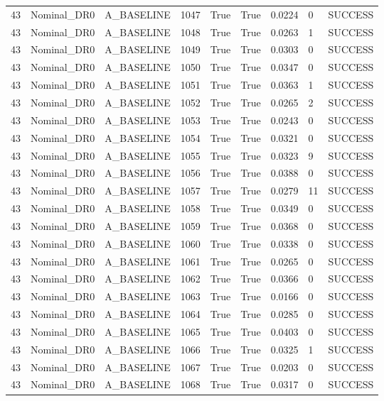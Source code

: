 \documentclass[11pt,a4paper,oneside]{book}
\begin{document}
\begin{longtable}{l l l l l l l l l}
43 & Nominal\_DR0 & A\_BASELINE & 1047 & True & True & 0.0224 & 0 & SUCCESS \\
43 & Nominal\_DR0 & A\_BASELINE & 1048 & True & True & 0.0263 & 1 & SUCCESS \\
43 & Nominal\_DR0 & A\_BASELINE & 1049 & True & True & 0.0303 & 0 & SUCCESS \\
43 & Nominal\_DR0 & A\_BASELINE & 1050 & True & True & 0.0347 & 0 & SUCCESS \\
43 & Nominal\_DR0 & A\_BASELINE & 1051 & True & True & 0.0363 & 1 & SUCCESS \\
43 & Nominal\_DR0 & A\_BASELINE & 1052 & True & True & 0.0265 & 2 & SUCCESS \\
43 & Nominal\_DR0 & A\_BASELINE & 1053 & True & True & 0.0243 & 0 & SUCCESS \\
43 & Nominal\_DR0 & A\_BASELINE & 1054 & True & True & 0.0321 & 0 & SUCCESS \\
43 & Nominal\_DR0 & A\_BASELINE & 1055 & True & True & 0.0323 & 9 & SUCCESS \\
43 & Nominal\_DR0 & A\_BASELINE & 1056 & True & True & 0.0388 & 0 & SUCCESS \\
43 & Nominal\_DR0 & A\_BASELINE & 1057 & True & True & 0.0279 & 11 & SUCCESS \\
43 & Nominal\_DR0 & A\_BASELINE & 1058 & True & True & 0.0349 & 0 & SUCCESS \\
43 & Nominal\_DR0 & A\_BASELINE & 1059 & True & True & 0.0368 & 0 & SUCCESS \\
43 & Nominal\_DR0 & A\_BASELINE & 1060 & True & True & 0.0338 & 0 & SUCCESS \\
43 & Nominal\_DR0 & A\_BASELINE & 1061 & True & True & 0.0265 & 0 & SUCCESS \\
43 & Nominal\_DR0 & A\_BASELINE & 1062 & True & True & 0.0366 & 0 & SUCCESS \\
43 & Nominal\_DR0 & A\_BASELINE & 1063 & True & True & 0.0166 & 0 & SUCCESS \\
43 & Nominal\_DR0 & A\_BASELINE & 1064 & True & True & 0.0285 & 0 & SUCCESS \\
43 & Nominal\_DR0 & A\_BASELINE & 1065 & True & True & 0.0403 & 0 & SUCCESS \\
43 & Nominal\_DR0 & A\_BASELINE & 1066 & True & True & 0.0325 & 1 & SUCCESS \\
43 & Nominal\_DR0 & A\_BASELINE & 1067 & True & True & 0.0203 & 0 & SUCCESS \\
43 & Nominal\_DR0 & A\_BASELINE & 1068 & True & True & 0.0317 & 0 & SUCCESS \\

\end{longtable}
\end{document}

